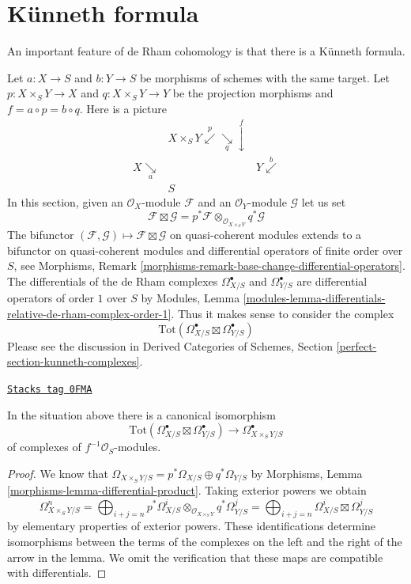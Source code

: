 \section{K\"unneth formula}
\label{derham-section-kunneth}
An important feature of de Rham cohomology is that there is a
K\"unneth formula.

\medskip\noindent
Let $a : X \to S$ and $b : Y \to S$ be morphisms of schemes with the same
target. Let $p : X \times_S Y \to X$ and $q : X \times_S Y \to Y$ be the
projection morphisms and $f = a \circ p = b \circ q$. Here is a picture
$$
\begin{array}{ccc} & X \times_S Y \overset{p}{\swarrow}\underset{q}{\searrow}\overset{f}{\downarrow} &  \\ X \underset{a}{\searrow} &  & Y \overset{b}{\swarrow} \\  & S & \end{array}
$$
In this section, given an $\mathcal{O}_X$-module $\mathcal{F}$
and an $\mathcal{O}_Y$-module $\mathcal{G}$ let us set
$$
\mathcal{F} \boxtimes \mathcal{G} =
p^*\mathcal{F} \otimes_{\mathcal{O}_{X \times_S Y}} q^*\mathcal{G}
$$
The bifunctor
$(\mathcal{F}, \mathcal{G}) \mapsto \mathcal{F} \boxtimes \mathcal{G}$
on quasi-coherent modules extends to a bifunctor on quasi-coherent modules
and differential operators of finite order over $S$, see
Morphisms, Remark \ref{morphisms-remark-base-change-differential-operators}.
The differentials of the de Rham complexes $\Omega^\bullet_{X/S}$ and
$\Omega^\bullet_{Y/S}$ are differential operators of order $1$
over $S$ by Modules, Lemma
\ref{modules-lemma-differentials-relative-de-rham-complex-order-1}.
Thus it makes sense to consider the complex
$$
\text{Tot}(\Omega^\bullet_{X/S} \boxtimes \Omega^\bullet_{Y/S})
$$
Please see the discussion in Derived Categories of Schemes, Section
\ref{perfect-section-kunneth-complexes}.

\begin{lemma}
\label{derham-lemma-de-rham-complex-product}
\href{https://stacks.math.columbia.edu/tag/0FMA}{\texttt{Stacks tag 0FMA}}

In the situation above there is a canonical isomorphism
$$
\text{Tot}(\Omega^\bullet_{X/S} \boxtimes \Omega^\bullet_{Y/S})
\longrightarrow
\Omega^\bullet_{X \times_S Y/S}
$$
of complexes of $f^{-1}\mathcal{O}_S$-modules.
\end{lemma}

\begin{proof}
We know that
$
\Omega_{X \times_S Y/S} = p^*\Omega_{X/S} \oplus q^*\Omega_{Y/S}
$
by Morphisms, Lemma \ref{morphisms-lemma-differential-product}.
Taking exterior powers we obtain
$$
\Omega^n_{X \times_S Y/S} =
\bigoplus\nolimits_{i + j = n}
p^*\Omega^i_{X/S} \otimes_{\mathcal{O}_{X \times_S Y}} q^*\Omega^j_{Y/S} =
\bigoplus\nolimits_{i + j = n}
\Omega^i_{X/S} \boxtimes \Omega^j_{Y/S}
$$
by elementary properties of exterior powers. These identifications determine
isomorphisms between the terms of the complexes on the left and the right
of the arrow in the lemma. We omit the verification that these maps
are compatible with differentials.
\end{proof}

